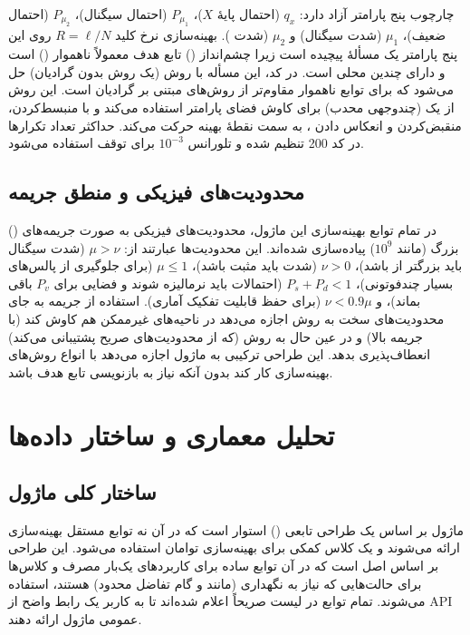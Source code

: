 چارچوب  پنج پارامتر آزاد دارد: $q_x$ (احتمال پایۀ $X$)، $P_{\mu_1}$ (احتمال سیگنال)، $P_{\mu_2}$ (احتمال  ضعیف)، $\mu_1$ (شدت سیگنال) و $\mu_2$ (شدت ). بهینه‌سازی نرخ کلید $R = \ell / N$ روی این پنج پارامتر یک مسألۀ پیچیده است زیرا چشم‌انداز () تابع هدف معمولاً ناهموار () است و دارای چندین محلی است. در کد، این مسأله با روش  (یک روش بدون گرادیان) حل می‌شود که برای توابع ناهموار مقاوم‌تر از روش‌های مبتنی بر گرادیان است. این روش از یک  (چندوجهی محدب) برای کاوش فضای پارامتر استفاده می‌کند و با منبسط‌کردن، منقبض‌کردن و انعکاس دادن ، به سمت نقطۀ بهینه حرکت می‌کند. حداکثر تعداد تکرارها در کد 200 تنظیم شده و تلورانس $10^{-3}$ برای توقف استفاده می‌شود.

\subsection{محدودیت‌های فیزیکی و منطق جریمه}

در تمام توابع بهینه‌سازی این ماژول، محدودیت‌های فیزیکی به صورت جریمه‌های () بزرگ (مانند $10^9$) پیاده‌سازی شده‌اند. این محدودیت‌ها عبارتند از: $\mu > \nu$ (شدت سیگنال باید بزرگتر از  باشد)، $\nu > 0$ (شدت باید مثبت باشد)، $\mu \le 1$ (برای جلوگیری از پالس‌های بسیار چندفوتونی)، $P_s + P_d < 1$ (احتمالات باید نرمالیزه شوند و فضایی برای $P_v$ باقی بماند)، و $\nu < 0.9 \mu$ (برای حفظ قابلیت تفکیک آماری). استفاده از جریمه به جای محدودیت‌های سخت به روش  اجازه می‌دهد در ناحیه‌های غیرممکن هم کاوش کند (با جریمه بالا) و در عین حال به روش  (که از محدودیت‌های صریح پشتیبانی می‌کند) انعطاف‌پذیری بدهد. این طراحی ترکیبی به ماژول اجازه می‌دهد با انواع روش‌های بهینه‌سازی کار کند بدون آنکه نیاز به بازنویسی تابع هدف باشد.

\section{تحلیل معماری و ساختار داده‌ها}

\subsection{ساختار کلی ماژول}

ماژول  بر اساس یک طراحی تابعی () استوار است که در آن نه توابع مستقل بهینه‌سازی ارائه می‌شوند و یک کلاس کمکی  برای بهینه‌سازی توامان استفاده می‌شود. این طراحی بر اساس اصل  است که در آن توابع ساده برای کاربردهای یک‌بار مصرف و کلاس‌ها برای حالت‌هایی که نیاز به نگهداری  (مانند  و گام تفاضل محدود) هستند، استفاده می‌شوند. تمام توابع در لیست  صریحاً اعلام شده‌اند تا به کاربر یک رابط واضح از API عمومی ماژول ارائه دهند.

